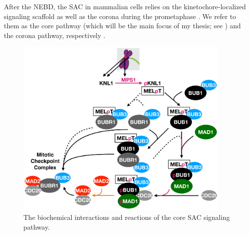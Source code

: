 After the NEBD, the SAC in mammalian cells relies on the kinetochore-localized signaling scaffold  as well as the corona during the prometaphase \cite{GSK923295LateralAttachmentEM, LateralAttachmentSAC, CoronaActivatesSAC}. We refer to them as the core pathway (which will be the main focus of my thesis; see ) and the corona pathway, respectively \cite{RZZ-MAD1vsBUB1-MAD1_2015, eSAC}.

\begin{figure}
    \centering
    \includegraphics[width=0.94\textwidth]{chapters/figures/CoreSAC.pdf}
    \caption{The biochemical interactions and reactions of the core SAC signaling pathway.}

\end{figure}
